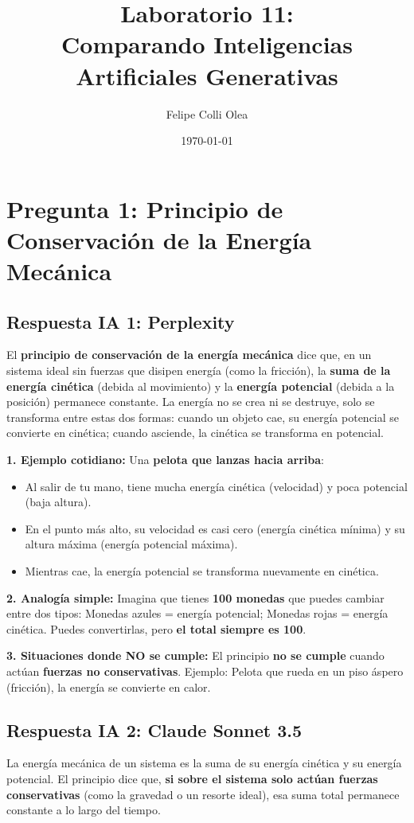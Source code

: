 \documentclass[11pt]{article}
\title{Laboratorio 11: \\ \large{Comparando Inteligencias Artificiales Generativas}}
\author{Felipe Colli Olea}
\date{\today}
\begin{document}
\maketitle
\thispagestyle{fancy}

\section*{Pregunta 1: Principio de Conservación de la Energía Mecánica}

\subsection*{Respuesta IA 1: Perplexity}
El \textbf{principio de conservación de la energía mecánica} dice que, en un sistema ideal sin fuerzas que disipen energía (como la fricción), la \textbf{suma de la energía cinética} (debida al movimiento) y la \textbf{energía potencial} (debida a la posición) permanece constante. La energía no se crea ni se destruye, solo se transforma entre estas dos formas: cuando un objeto cae, su energía potencial se convierte en cinética; cuando asciende, la cinética se transforma en potencial.

\textbf{1. Ejemplo cotidiano:} Una \textbf{pelota que lanzas hacia arriba}:
\begin{itemize}
	\item Al salir de tu mano, tiene mucha energía cinética (velocidad) y poca potencial (baja altura).
	\item En el punto más alto, su velocidad es casi cero (energía cinética mínima) y su altura máxima (energía potencial máxima).
	\item Mientras cae, la energía potencial se transforma nuevamente en cinética.
\end{itemize}

\textbf{2. Analogía simple:} Imagina que tienes \textbf{100 monedas} que puedes cambiar entre dos tipos: Monedas azules = energía potencial; Monedas rojas = energía cinética. Puedes convertirlas, pero \textbf{el total siempre es 100}.

\textbf{3. Situaciones donde NO se cumple:} El principio \textbf{no se cumple} cuando actúan \textbf{fuerzas no conservativas}. Ejemplo: Pelota que rueda en un piso áspero (fricción), la energía se convierte en calor.

\subsection*{Respuesta IA 2: Claude Sonnet 3.5}
La energía mecánica de un sistema es la suma de su energía cinética y su energía potencial. El principio dice que, \textbf{si sobre el sistema solo actúan fuerzas conservativas} (como la gravedad o un resorte ideal), esa suma total permanece constante a lo largo del tiempo.
\end{document}
